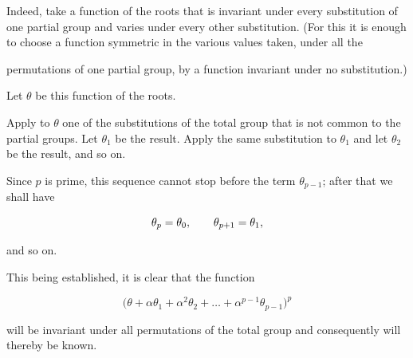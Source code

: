 Indeed, take a function of the roots that is invariant under every substitution
of one partial group and varies under every other substitution. (For this it is
enough to choose a function symmetric in the various values taken, under all
the


permutations of one partial group, by a function invariant under no
substitution.)


Let $\theta$ be this function of the roots.

Apply to $\theta$ one of the substitutions of the total group that is not common
to the partial groups. Let $\theta_{1}$ be the result. Apply the same substitution
to $\theta_{1}$ and let $\theta_{2}$ be the result, and so on.

Since $p$ is prime, this sequence cannot stop before the term
$\theta_{p-1}$; after that we shall have

\[
\GalControlReading{\theta_{p}=\theta_{0},\qquad \theta_{p+1}=\theta_{1}}{W09-CD002},
\]

and so on.

This being established, it is clear that the function

\[
\bigl(\theta+\alpha\theta_{1}
        +\alpha^{2}\theta_{2}+\ldots
        +\alpha^{p-1}\theta_{p-1}\bigr)^{p}
\]


will be invariant under all permutations of the total group and consequently
will thereby be known.

